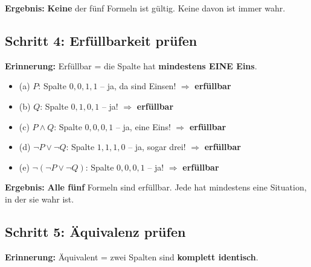 \documentclass[a4paper,12pt]{article}
\begin{document}
\begin{merkbox}
\textbf{Ergebnis:} \textbf{Keine} der f\"unf Formeln ist g\"ultig. Keine davon ist immer wahr.
\end{merkbox}

\subsection{Schritt 4: Erf\"ullbarkeit pr\"ufen}

\begin{merkbox}
\textbf{Erinnerung:} Erf\"ullbar = die Spalte hat \textbf{mindestens EINE Eins}.
\end{merkbox}

\begin{itemize}
\item (a) $P$: Spalte $0, 0, 1, 1$ -- ja, da sind Einsen! $\Rightarrow$ \textbf{erf\"ullbar}
\item (b) $Q$: Spalte $0, 1, 0, 1$ -- ja! $\Rightarrow$ \textbf{erf\"ullbar}
\item (c) $P \wedge Q$: Spalte $0, 0, 0, 1$ -- ja, eine Eins! $\Rightarrow$ \textbf{erf\"ullbar}
\item (d) $\neg P \vee \neg Q$: Spalte $1, 1, 1, 0$ -- ja, sogar drei! $\Rightarrow$ \textbf{erf\"ullbar}
\item (e) $\neg(\neg P \vee \neg Q)$: Spalte $0, 0, 0, 1$ -- ja! $\Rightarrow$ \textbf{erf\"ullbar}
\end{itemize}

\begin{merkbox}
\textbf{Ergebnis:} \textbf{Alle f\"unf} Formeln sind erf\"ullbar. Jede hat mindestens eine Situation, in der sie wahr ist.
\end{merkbox}

\subsection{Schritt 5: \"Aquivalenz pr\"ufen}

\begin{merkbox}
\textbf{Erinnerung:} \"Aquivalent = zwei Spalten sind \textbf{komplett identisch}.
\end{merkbox}
\end{document}
